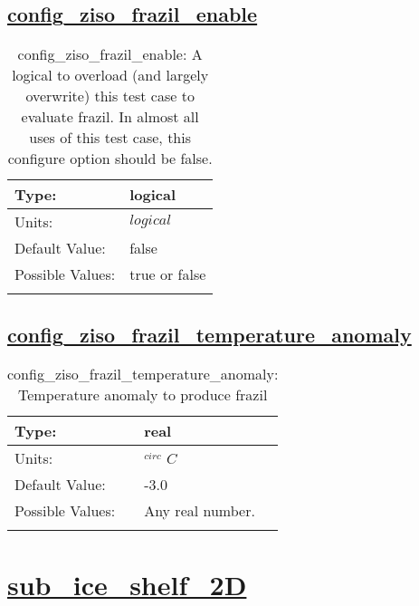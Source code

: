 \subsection[config\_ziso\_frazil\_enable]{\hyperref[sec:nm_tab_ziso]{config\_ziso\_frazil\_enable}}
\label{subsec:nm_sec_config_ziso_frazil_enable}
\begin{center}
\begin{longtable}{| p{2.0in} || p{4.0in} |}
    \hline
    Type: & logical \\
    \hline
    Units: & $logical$ \\
    \hline
    Default Value: & false \\
    \hline
    Possible Values: & true or false \\
    \hline
    \caption{config\_ziso\_frazil\_enable: A logical to overload (and largely overwrite) this test case to evaluate frazil. In almost all uses of this test case, this configure option should be false.}
\end{longtable}
\end{center}
\subsection[config\_ziso\_frazil\_temperature\_anomaly]{\hyperref[sec:nm_tab_ziso]{config\_ziso\_frazil\_temperature\_anomaly}}
\label{subsec:nm_sec_config_ziso_frazil_temperature_anomaly}
\begin{center}
\begin{longtable}{| p{2.0in} || p{4.0in} |}
    \hline
    Type: & real \\
    \hline
    Units: & $^{circ}$ $C$ \\
    \hline
    Default Value: & -3.0 \\
    \hline
    Possible Values: & Any real number. \\
    \hline
    \caption{config\_ziso\_frazil\_temperature\_anomaly: Temperature anomaly to produce frazil}
\end{longtable}
\end{center}
\section[sub\_ice\_shelf\_2D]{\hyperref[sec:nm_tab_sub_ice_shelf_2D]{sub\_ice\_shelf\_2D}}
\label{sec:nm_sec_sub_ice_shelf_2D}
